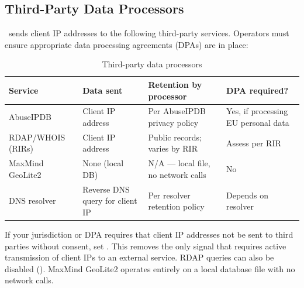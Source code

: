 \subsection{Third-Party Data Processors}

\ja\ sends client IP addresses to the following third-party services. Operators must
ensure appropriate data processing agreements (DPAs) are in place:

\begin{fullwidth}
\begin{table}[h]
\caption{Third-party data processors}
\label{tab:processors}
\begin{tabular}{@{}lllp{4cm}@{}}
\toprule
\textbf{Service} & \textbf{Data sent} & \textbf{Retention by processor} & \textbf{DPA required?} \\
\midrule
AbuseIPDB & Client IP address & Per AbuseIPDB privacy policy & Yes, if processing EU personal data \\
RDAP/WHOIS (RIRs) & Client IP address & Public records; varies by RIR & Assess per RIR \\
MaxMind GeoLite2 & None (local DB) & N/A — local file, no network calls & No \\
DNS resolver & Reverse DNS query for client IP & Per resolver retention policy & Depends on resolver \\
\bottomrule
\end{tabular}
\end{table}
\end{fullwidth}

\begin{notebox}
If your jurisdiction or DPA requires that client IP addresses not be sent to third
parties without consent, set . This removes the
only signal that requires active transmission of client IPs to an external service.
RDAP queries can also be disabled ().
MaxMind GeoLite2 operates entirely on a local database file with no network calls.
\end{notebox}
